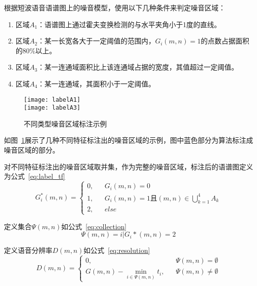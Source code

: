根据短波语音语谱图上的噪音模型，使用以下几种条件来判定噪音区域：
\begin{enumerate}
\item 区域$A_1$：语谱图上通过霍夫变换检测的与水平夹角小于1度的直线。
\item 区域$A_2$：某一长宽各大于一定阈值的范围内，$G_i(m,n)=1$的点数占据面积的80\%以上。
\item 区域$A_3$：某一连通域面积比上该连通域占据的宽度，其值超过一定阈值。
\item 区域$A_4$：某一连通域，其面积小于一定阈值。
\end{enumerate}

\begin{figure}
\centering
{} {
    \texttt{[image: labelA1]}
}
\vspace{0.8ex}
\\
 {
    \texttt{[image: labelA3]}
}
\vspace{0.8ex}
\\
\caption{不同类型噪音区域标注示例\label{fig:noise-labels}}
\end{figure}

如图~\ref{fig:noise-labels}展示了几种不同特征标注出的噪音区域的示例，图中蓝色部分为算法标注成噪音区域的部分。

对不同特征标注出的噪音区域取并集，作为完整的噪音区域，标注后的语谱图定义为公式~\ref{eq:label_tf}
\begin{equation}\label{eq:label_tf}
G_i^*(m, n) = \left\{
    \begin{array}{rcl}
    0, && {G_i(m,n)=0} \\
    1, && {G_i(m,n)=1且(m,n)\in \bigcup_{k=1}^4 A_k} \\
    2, && {else}
    \end{array} \right.
\end{equation}

定义集合$\Psi(m,n)$如公式~\ref{eq:collection}
\begin{equation}\label{eq:collection}
\Psi(m,n)={i|G_i*(m,n)=2}
\end{equation}

定义语音分辨率$D(m,n)$如公式~\ref{eq:resolution}
\begin{equation}\label{eq:resolution}
D(m,n) =  \left\{
    \begin{array}{rcl}
    0, && {\Psi(m,n)=\emptyset} \\
    G(m,n) - \min\limits_{i\in\Psi(m,n)}t_i, && {\Psi(m,n)\neq\emptyset}
    \end{array} \right.
\end{equation}

